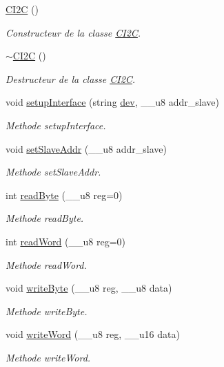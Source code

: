\begin{DoxyCompactItemize}
\item 
\hyperlink{class_c_i2_c_a2df83a2627a8b8bf91460a68372c9ed5}{C\+I2\+C} ()
\begin{DoxyCompactList}\small\item\em Constructeur de la classe \hyperlink{class_c_i2_c}{C\+I2\+C}. \end{DoxyCompactList}\item 
\hyperlink{class_c_i2_c_ae757710bb84ab327217092f0af851a16}{$\sim$\+C\+I2\+C} ()
\begin{DoxyCompactList}\small\item\em Destructeur de la classe \hyperlink{class_c_i2_c}{C\+I2\+C}. \end{DoxyCompactList}\item 
void \hyperlink{class_c_i2_c_a8fe8755470906582ab854edcbf2a2992}{setup\+Interface} (string \hyperlink{class_c_i2_c_ae2d4648eadc2acae86a49cecbf39ce56}{dev}, \+\_\+\+\_\+u8 addr\+\_\+slave)
\begin{DoxyCompactList}\small\item\em Methode setup\+Interface. \end{DoxyCompactList}\item 
void \hyperlink{class_c_i2_c_ae766fc56ba88f9063e86412fca0c1dfc}{set\+Slave\+Addr} (\+\_\+\+\_\+u8 addr\+\_\+slave)
\begin{DoxyCompactList}\small\item\em Methode set\+Slave\+Addr. \end{DoxyCompactList}\item 
int \hyperlink{class_c_i2_c_afb589b9bdefa75257807b4e6ac2c1c5a}{read\+Byte} (\+\_\+\+\_\+u8 reg=0)
\begin{DoxyCompactList}\small\item\em Methode read\+Byte. \end{DoxyCompactList}\item 
int \hyperlink{class_c_i2_c_a283d5f6d8371e2abb6532b9e32392f9a}{read\+Word} (\+\_\+\+\_\+u8 reg=0)
\begin{DoxyCompactList}\small\item\em Methode read\+Word. \end{DoxyCompactList}\item 
void \hyperlink{class_c_i2_c_a26517fc7e3a282863ff09e7a792f4386}{write\+Byte} (\+\_\+\+\_\+u8 reg, \+\_\+\+\_\+u8 data)
\begin{DoxyCompactList}\small\item\em Methode write\+Byte. \end{DoxyCompactList}\item 
void \hyperlink{class_c_i2_c_a14250174d9281db1bc1db2360cacee40}{write\+Word} (\+\_\+\+\_\+u8 reg, \+\_\+\+\_\+u16 data)
\begin{DoxyCompactList}\small\item\em Methode write\+Word. \end{DoxyCompactList}\end{DoxyCompactItemize}
